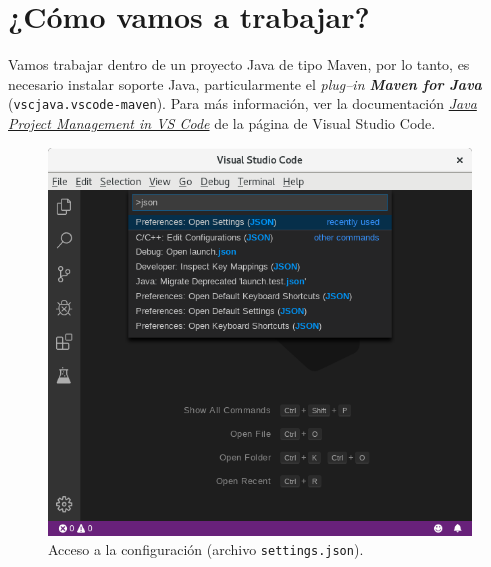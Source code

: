\documentclass[a5paper,10pt]{article}
\begin{document}
\begin{center}
\end{center}


\section{¿Cómo vamos a trabajar?}

Vamos trabajar dentro de un proyecto Java de tipo Maven, por lo tanto, es necesario instalar soporte Java, particularmente el \emph{plug--in \textbf{Maven for Java}} (\verb|vscjava.vscode-maven|).  Para más información, ver la documentación \href{https://code.visualstudio.com/docs/java/java-project}{\emph{Java Project Management in VS Code}} de la página de Visual Studio Code.

\begin{figure}[p]
	\centering
	\includegraphics[width=.95\textwidth]{SelectJSON}
	\caption{Acceso a la configuración (archivo \texttt{settings.json}).}
	\label{preferences}
\end{figure}
\end{document}
